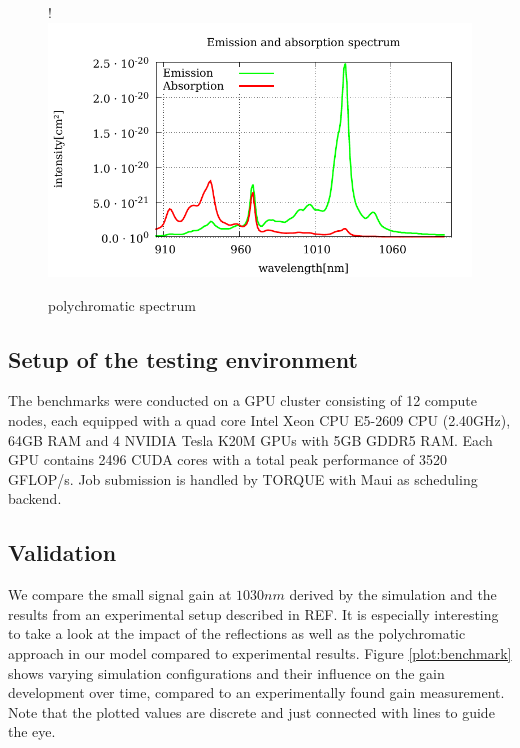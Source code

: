 \begin{figure}[H]
  \centerline{
     {!} {\includegraphics{plot/sigma.pdf}}
  }
  \caption{polychromatic spectrum}
  \label{plot:polychromatic_spectrum}
\end{figure}

\subsection{Setup of the testing environment}
\label{subsec:testingEnvironment}

The benchmarks were conducted on a GPU cluster consisting of 12 compute nodes,
each equipped with a quad core Intel Xeon CPU E5-2609 CPU (2.40GHz), 64GB RAM
and 4 NVIDIA Tesla K20M GPUs with 5GB GDDR5 RAM. Each GPU contains 2496 CUDA cores with a total
peak performance of 3520 GFLOP/s. Job submission is handled by TORQUE\cite{torque} 
with Maui\cite{maui} as scheduling backend. 


\subsection{Validation}
\label{subsec:validation}
We compare the small signal gain at $1030 nm$
derived by the simulation and the results from an experimental setup described in REF. 
It is especially interesting to take a look at the impact of the reflections as well as the polychromatic
approach in our model compared to experimental results. Figure \ref{plot:benchmark} shows
varying simulation configurations and their influence on the
gain development over time, compared to an experimentally found gain measurement.
Note that the plotted values are discrete and just connected with lines to guide the eye.

